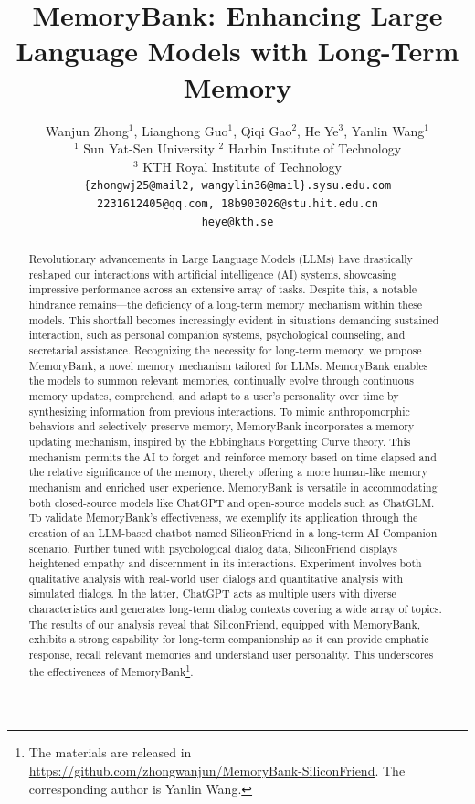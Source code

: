 \documentclass{article}
\title{MemoryBank: Enhancing Large Language Models with Long-Term Memory}
\author{
	Wanjun Zhong$^{1}$, Lianghong Guo$^{1}$, Qiqi Gao$^{2}$, He Ye$^{3}$,  Yanlin Wang$^{1}$\\
	$^1$ Sun Yat-Sen University 
	$^2$ Harbin Institute of Technology \\
	$^3$ KTH Royal Institute of Technology \\
	\texttt{\{zhongwj25@mail2, wangylin36@mail\}.sysu.edu.com} \\ 
	\texttt{2231612405@qq.com, 18b903026@stu.hit.edu.cn}\\
	\texttt{heye@kth.se}
}
\begin{document}
\maketitle


\begin{abstract}


Revolutionary advancements in Large Language Models (LLMs) have drastically reshaped our interactions with artificial intelligence (AI) systems, showcasing impressive performance across an extensive array of tasks. Despite this, a notable hindrance remains—the deficiency of a long-term memory mechanism within these models. This shortfall becomes increasingly evident in situations demanding sustained interaction, such as personal companion systems, psychological counseling, and secretarial assistance.
Recognizing the necessity for long-term memory, we propose MemoryBank, a novel memory mechanism tailored for LLMs. MemoryBank enables the models to summon relevant memories, continually evolve through continuous memory updates, comprehend, and adapt to a user's personality over time by synthesizing information from previous interactions. 
To mimic anthropomorphic behaviors and selectively preserve memory, MemoryBank incorporates a memory updating mechanism, inspired by the Ebbinghaus Forgetting Curve theory. This mechanism permits the AI to forget and reinforce memory based on time elapsed and the relative significance of the memory, thereby offering a more human-like memory mechanism and enriched user experience.
MemoryBank is versatile in accommodating both closed-source models like ChatGPT and open-source models such as ChatGLM.
To validate MemoryBank's effectiveness, we exemplify its application through the creation of an LLM-based chatbot named SiliconFriend in a long-term AI Companion scenario. Further tuned with psychological dialog data, SiliconFriend displays heightened empathy and discernment in its interactions.
 Experiment involves both qualitative analysis with real-world user dialogs and quantitative analysis with simulated dialogs. 
 In the latter, ChatGPT acts as multiple users with diverse characteristics and generates long-term dialog contexts covering a wide array of topics. The results of our analysis reveal that SiliconFriend, equipped with MemoryBank, exhibits a strong capability for long-term companionship as it can provide emphatic response, recall relevant memories and understand user personality. This underscores the effectiveness of MemoryBank\footnote{The materials are released in \url{https://github.com/zhongwanjun/MemoryBank-SiliconFriend}. The corresponding author is Yanlin Wang.}.
 
\end{abstract}










\end{document}
